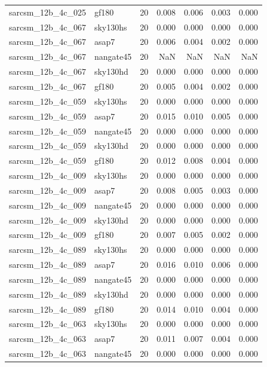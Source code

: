 \begin{tabular}{llrrrrr}
sarcsm\_12b\_4c\_025 & gf180 & 20 & 0.008 & 0.006 & 0.003 & 0.000 \\
sarcsm\_12b\_4c\_067 & sky130hs & 20 & 0.000 & 0.000 & 0.000 & 0.000 \\
sarcsm\_12b\_4c\_067 & asap7 & 20 & 0.006 & 0.004 & 0.002 & 0.000 \\
sarcsm\_12b\_4c\_067 & nangate45 & 20 & NaN & NaN & NaN & NaN \\
sarcsm\_12b\_4c\_067 & sky130hd & 20 & 0.000 & 0.000 & 0.000 & 0.000 \\
sarcsm\_12b\_4c\_067 & gf180 & 20 & 0.005 & 0.004 & 0.002 & 0.000 \\
sarcsm\_12b\_4c\_059 & sky130hs & 20 & 0.000 & 0.000 & 0.000 & 0.000 \\
sarcsm\_12b\_4c\_059 & asap7 & 20 & 0.015 & 0.010 & 0.005 & 0.000 \\
sarcsm\_12b\_4c\_059 & nangate45 & 20 & 0.000 & 0.000 & 0.000 & 0.000 \\
sarcsm\_12b\_4c\_059 & sky130hd & 20 & 0.000 & 0.000 & 0.000 & 0.000 \\
sarcsm\_12b\_4c\_059 & gf180 & 20 & 0.012 & 0.008 & 0.004 & 0.000 \\
sarcsm\_12b\_4c\_009 & sky130hs & 20 & 0.000 & 0.000 & 0.000 & 0.000 \\
sarcsm\_12b\_4c\_009 & asap7 & 20 & 0.008 & 0.005 & 0.003 & 0.000 \\
sarcsm\_12b\_4c\_009 & nangate45 & 20 & 0.000 & 0.000 & 0.000 & 0.000 \\
sarcsm\_12b\_4c\_009 & sky130hd & 20 & 0.000 & 0.000 & 0.000 & 0.000 \\
sarcsm\_12b\_4c\_009 & gf180 & 20 & 0.007 & 0.005 & 0.002 & 0.000 \\
sarcsm\_12b\_4c\_089 & sky130hs & 20 & 0.000 & 0.000 & 0.000 & 0.000 \\
sarcsm\_12b\_4c\_089 & asap7 & 20 & 0.016 & 0.010 & 0.006 & 0.000 \\
sarcsm\_12b\_4c\_089 & nangate45 & 20 & 0.000 & 0.000 & 0.000 & 0.000 \\
sarcsm\_12b\_4c\_089 & sky130hd & 20 & 0.000 & 0.000 & 0.000 & 0.000 \\
sarcsm\_12b\_4c\_089 & gf180 & 20 & 0.014 & 0.010 & 0.004 & 0.000 \\
sarcsm\_12b\_4c\_063 & sky130hs & 20 & 0.000 & 0.000 & 0.000 & 0.000 \\
sarcsm\_12b\_4c\_063 & asap7 & 20 & 0.011 & 0.007 & 0.004 & 0.000 \\
sarcsm\_12b\_4c\_063 & nangate45 & 20 & 0.000 & 0.000 & 0.000 & 0.000 \\

\end{tabular}
